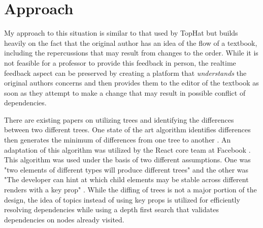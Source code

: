 \section{Approach}

My approach to this situation is similar to that used by TopHat but builds heavily on the fact that the original author has an idea of the flow of a textbook, including the repercussions that may result from changes to the order. While it is not feasible for a professor to provide this feedback in person, the realtime feedback aspect can be preserved by creating a platform that \textit{understands} the original authors concerns and then provides them to the editor of the textbook as soon as they attempt to make a change that may result in possible conflict of dependencies.

There are existing papers on utilizing trees and identifying the differences between two different trees. One state of the art algorithm identifies differences then generates the minimum of differences from one tree to another \cite{bile}\cite{tsur}. An adaptation of this algorithm was utilized by the React core team at Facebook \cite{reactReconcile}. This algorithm was used under the basis of two different assumptions. One was "two elements of different types will produce different trees" and the other was "The developer can hint at which child elements may be stable across different renders with a key prop" \cite{reactReconcile}. While the diffing of trees is not a major portion of the design, the idea of topics instead of using key props is utilized for efficiently resolving dependencies while using a depth first search that validates dependencies on nodes already visited.
